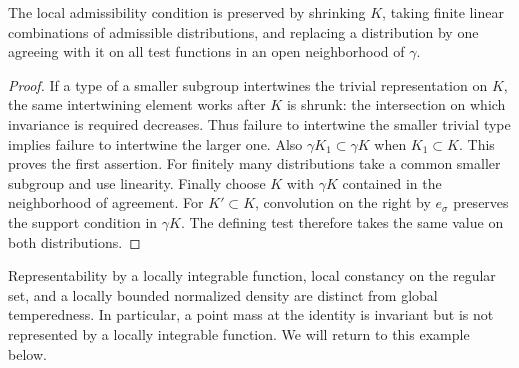 \begin{lemma}\label{lem:admissibility-local}
The local admissibility condition is preserved by shrinking $K$, taking finite linear combinations of admissible distributions, and replacing a distribution by one agreeing with it on all test functions in an open neighborhood of $\gamma$.
\end{lemma}
\begin{proof}
If a type of a smaller subgroup intertwines the trivial representation on $K$, the same intertwining element works after $K$ is shrunk: the intersection on which invariance is required decreases. Thus failure to intertwine the smaller trivial type implies failure to intertwine the larger one. Also $\gamma K_1\subset\gamma K$ when $K_1\subset K$. This proves the first assertion. For finitely many distributions take a common smaller subgroup and use linearity. Finally choose $K$ with $\gamma K$ contained in the neighborhood of agreement. For $K'\subset K$, convolution on the right by $e_\sigma$ preserves the support condition in $\gamma K$. The defining test therefore takes the same value on both distributions.
\end{proof}

Representability by a locally integrable function, local constancy on the regular set, and a locally bounded normalized density are distinct from global temperedness. In particular, a point mass at the identity is invariant but is not represented by a locally integrable function. We will return to this example below.


